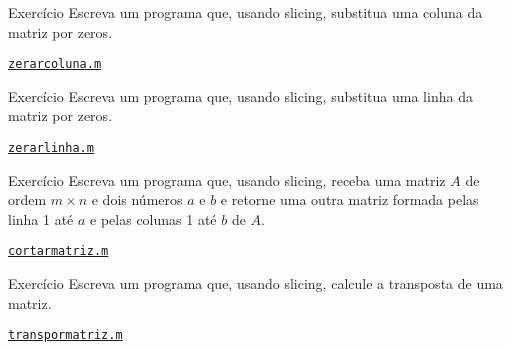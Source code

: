 \documentclass[hyperref={pdfpagelabels=false}]{beamer}
\begin{document}
\begin{frame}{Exercício}
  Escreva um programa que, usando slicing, substitua uma coluna da matriz por zeros.
  \vfill
  \begin{center} \href{listings/zerarcoluna.m}{\underline{\texttt{zerarcoluna.m}}} \end{center}
\end{frame}

\begin{frame}{Exercício}
  Escreva um programa que, usando slicing, substitua uma linha da matriz por zeros.
  \vfill
  \begin{center} \href{listings/zerarlinha.m}{\underline{\texttt{zerarlinha.m}}} \end{center}
\end{frame}

\begin{frame}{Exercício}
	Escreva um programa que, usando slicing, receba uma matriz $A$ de ordem $m\times n$ e dois números $a$ e $b$ e retorne uma outra matriz formada pelas linha 1 até $a$ e pelas colunas 1 até $b$ de $A$.
  \vfill
  \begin{center} \href{listings/cortarmatriz.m}{\underline{\texttt{cortarmatriz.m}}} \end{center}
\end{frame}

\begin{frame}{Exercício}
	Escreva um programa que, usando slicing, calcule a transposta de uma matriz.
  \vfill
  \begin{center} \href{listings/transpormatriz.m}{\underline{\texttt{transpormatriz.m}}} \end{center}
\end{frame}
\end{document}
